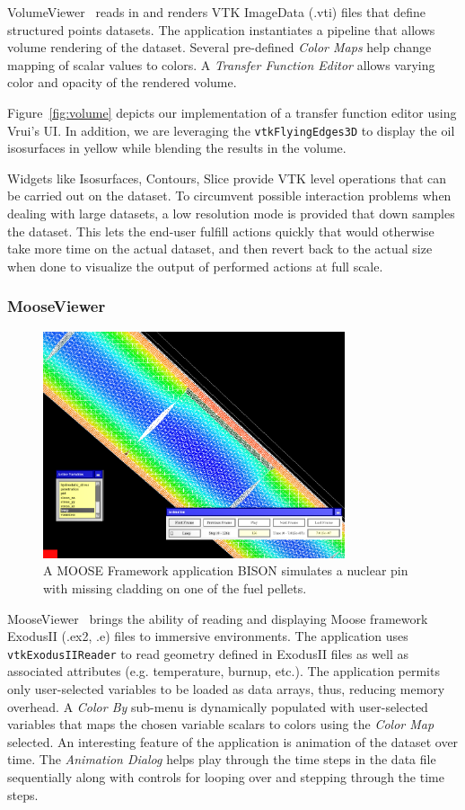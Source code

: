 VolumeViewer~\cite{VolumeViewer} reads in and renders VTK ImageData (.vti) files that define structured points datasets.  The application instantiates a pipeline that allows volume rendering of the dataset. Several pre-defined \textit{Color Maps} help change mapping of scalar values to colors. A  \textit{Transfer Function Editor} allows varying color and opacity of the rendered volume.

Figure~\ref{fig:volume} depicts our implementation of a transfer function editor using Vrui's UI. In addition, we are leveraging the \texttt{vtkFlyingEdges3D} to display the oil isosurfaces in yellow while blending the results in the volume.

Widgets like Isosurfaces, Contours, Slice provide VTK level operations that can be carried out on the dataset. To circumvent possible interaction problems when dealing with large datasets, a low resolution mode is provided that down samples the dataset. This lets the end-user fulfill actions quickly that would otherwise take more time on the actual dataset, and then revert back to the actual size when done to visualize the output of performed actions at full scale.

\subsubsection{MooseViewer}

\begin{figure}[h!]
 \centering
 \includegraphics[width=3.5in]{images/fuelpin.png}
 \caption{A MOOSE Framework application BISON simulates a nuclear pin with missing cladding on one of the fuel pellets.}
 \label{fig:fuelpin}
\end{figure}

MooseViewer~\cite{MooseViewer} brings the ability of reading and displaying Moose framework~\cite{Gaston:2015, MooseFramework} ExodusII (.ex2, .e) files to immersive environments. The application uses \texttt{vtkExodusIIReader} to read geometry defined in ExodusII files as well as associated attributes (e.g. temperature, burnup, etc.). The application permits only user-selected variables to be loaded as data arrays, thus, reducing memory overhead. A \textit{Color By} sub-menu is dynamically populated with user-selected variables that maps the chosen variable scalars to colors using the \textit{Color Map} selected. An interesting feature of the application is animation of the dataset over time. The \textit{Animation Dialog} helps play through the time steps in the data file sequentially along with controls for looping over and stepping through the time steps.

